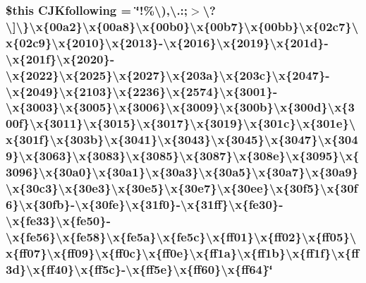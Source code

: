 \hypertarget{config_8php_aa6bb975979bbbab2f19827e1f704d4e3}{
\subsubsection[{C\-J\-Kfollowing}]{\setlength{\rightskip}{0pt plus 5cm}\$this C\-J\-Kfollowing = \char`\"{}!\%\textbackslash{}),\textbackslash{}.\-:;$>$\textbackslash{}?\textbackslash{}\mbox{]}\textbackslash{}\}\textbackslash{}x\{00a2\}\textbackslash{}x\{00a8\}\textbackslash{}x\{00b0\}\textbackslash{}x\{00b7\}\textbackslash{}x\{00bb\}\textbackslash{}x\{02c7\}\textbackslash{}x\{02c9\}\textbackslash{}x\{2010\}\textbackslash{}x\{2013\}-\/\textbackslash{}x\{2016\}\textbackslash{}x\{2019\}\textbackslash{}x\{201d\}-\/\textbackslash{}x\{201f\}\textbackslash{}x\{2020\}-\/\textbackslash{}x\{2022\}\textbackslash{}x\{2025\}\textbackslash{}x\{2027\}\textbackslash{}x\{203a\}\textbackslash{}x\{203c\}\textbackslash{}x\{2047\}-\/\textbackslash{}x\{2049\}\textbackslash{}x\{2103\}\textbackslash{}x\{2236\}\textbackslash{}x\{2574\}\textbackslash{}x\{3001\}-\/\textbackslash{}x\{3003\}\textbackslash{}x\{3005\}\textbackslash{}x\{3006\}\textbackslash{}x\{3009\}\textbackslash{}x\{300b\}\textbackslash{}x\{300d\}\textbackslash{}x\{300f\}\textbackslash{}x\{3011\}\textbackslash{}x\{3015\}\textbackslash{}x\{3017\}\textbackslash{}x\{3019\}\textbackslash{}x\{301c\}\textbackslash{}x\{301e\}\textbackslash{}x\{301f\}\textbackslash{}x\{303b\}\textbackslash{}x\{3041\}\textbackslash{}x\{3043\}\textbackslash{}x\{3045\}\textbackslash{}x\{3047\}\textbackslash{}x\{3049\}\textbackslash{}x\{3063\}\textbackslash{}x\{3083\}\textbackslash{}x\{3085\}\textbackslash{}x\{3087\}\textbackslash{}x\{308e\}\textbackslash{}x\{3095\}\textbackslash{}x\{3096\}\textbackslash{}x\{30a0\}\textbackslash{}x\{30a1\}\textbackslash{}x\{30a3\}\textbackslash{}x\{30a5\}\textbackslash{}x\{30a7\}\textbackslash{}x\{30a9\}\textbackslash{}x\{30c3\}\textbackslash{}x\{30e3\}\textbackslash{}x\{30e5\}\textbackslash{}x\{30e7\}\textbackslash{}x\{30ee\}\textbackslash{}x\{30f5\}\textbackslash{}x\{30f6\}\textbackslash{}x\{30fb\}-\/\textbackslash{}x\{30fe\}\textbackslash{}x\{31f0\}-\/\textbackslash{}x\{31ff\}\textbackslash{}x\{fe30\}-\/\textbackslash{}x\{fe33\}\textbackslash{}x\{fe50\}-\/\textbackslash{}x\{fe56\}\textbackslash{}x\{fe58\}\textbackslash{}x\{fe5a\}\textbackslash{}x\{fe5c\}\textbackslash{}x\{ff01\}\textbackslash{}x\{ff02\}\textbackslash{}x\{ff05\}\textbackslash{}x\{ff07\}\textbackslash{}x\{ff09\}\textbackslash{}x\{ff0c\}\textbackslash{}x\{ff0e\}\textbackslash{}x\{ff1a\}\textbackslash{}x\{ff1b\}\textbackslash{}x\{ff1f\}\textbackslash{}x\{ff3d\}\textbackslash{}x\{ff40\}\textbackslash{}x\{ff5c\}-\/\textbackslash{}x\{ff5e\}\textbackslash{}x\{ff60\}\textbackslash{}x\{ff64\}\char`\"{}}}\label{config_8php_aa6bb975979bbbab2f19827e1f704d4e3}


